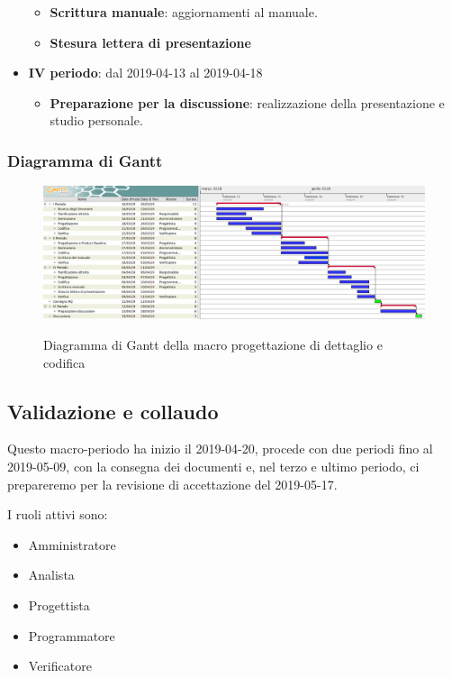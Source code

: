\begin{itemize}
\begin{itemize}
    	        \item \textbf{Scrittura manuale}: aggiornamenti al manuale.
    	        \item \textbf{Stesura lettera di presentazione}
        	\end{itemize}
        	\item \textbf{IV periodo}: dal 2019-04-13 al 2019-04-18
			\begin{itemize}
				\item \textbf{Preparazione per la discussione}: realizzazione della presentazione e studio personale.
        	\end{itemize}
        \end{itemize}

        \begin{landscape}
			\subsubsection{Diagramma di Gantt}
			\begin{figure}[H]
					\centering
					\includegraphics[scale=0.44]{img/Progettazione_di_dettaglio_e_codifica.png}\\
					\caption{Diagramma di Gantt della macro progettazione di dettaglio e codifica}
			\end{figure}
		\end{landscape}
		\newpage

        \subsection{Validazione e collaudo}\label{PianificazineValidazione}
		Questo macro-periodo ha inizio il 2019-04-20, procede con due periodi fino al 2019-05-09, con la consegna dei documenti e, nel terzo e ultimo periodo,
		ci prepareremo per la revisione di accettazione del 2019-05-17.

        I ruoli attivi sono:
        \begin{itemize}
            \item Amministratore
            \item Analista
            \item Progettista
            \item Programmatore
            \item Verificatore
		\end{itemize}

